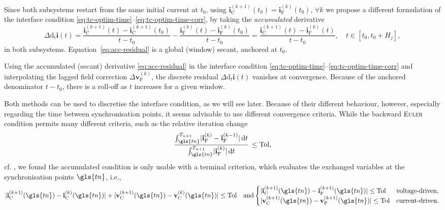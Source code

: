 Since both subsystems restart from the same initial current at $t_0$, using $\mathbf{i}_{\text{C}}^{(k+1)}(t_0) = \mathbf{i}_{\text{F}}^{(k)}(t_0), \, \forall k$ we propose a different formulation of the interface condition \eqref{eq:tc-optim-time}--\eqref{eq:tc-optim-time-corr}, by taking the \textit{accumulated} derivative
\begin{equation} \label{eq:acc-residual}
    \Delta \mathrm{d}_{t} \mathbf{i}(t) = \frac{\mathbf{i}_{\text{C}}^{(k+1)}(t) - \mathbf{i}_{\text{C}}^{(k+1)}(t_0)}{t-t_0} - \frac{\mathbf{i}_{\text{F}}^{(k)}(t) - \mathbf{i}_{\text{F}}^{(k)}(t_0)}{t-t_0} = \frac{\mathbf{i}_{\text{C}}^{(k+1)}(t) - \mathbf{i}_{\text{F}}^{(k)}(t)}{t-t_0}, \quad t \in [t_0, t_0 + H_j],
\end{equation}
in both subsystems. Equation~\eqref{eq:acc-residual} is a global (window) secant, anchored at $t_0$.

\begin{corollary} \label{corollary:acc-condition}
    Using the accumulated (secant) derivative \eqref{eq:acc-residual} in the interface condition \eqref{eq:tc-optim-time}--\eqref{eq:tc-optim-time-corr} and interpolating the lagged field correction $\Delta \mathbf{v}_{\text{F}}^{(k)}$, the discrete residual $\Delta \mathrm{d}_{t} \mathbf{i}(t)$ vanishes at convergence. Because of the anchored denominator $t-t_0$, there is a roll-off as $t$ increases for a given window.
\end{corollary}

Both methods can be used to discretise the interface condition, as we will see later. Because of their different behaviour, however, especially regarding the time between synchronisation points, it seems advisable to use different convergence criteria. While the backward \textsc{Euler} condition permits many different criteria, such as the relative iteration change
\begin{equation} \label{eq:L1-criterion}
    \frac{\int_{\gls{tn}}^{T_{n+1}} \lvert \mathbf{i}_{\text{F}}^{(k)} - \mathbf{i}_{\text{F}}^{(k-1)} \rvert \, \mathrm{d}t}{\int_{\gls{tn}}^{T_{n+1}} \lvert \mathbf{i}_{\text{F}}^{(k)} \rvert \, \mathrm{d}t} \, \leq \text{Tol},
\end{equation}
cf. \cite{Garcia2017}, we found the accumulated condition is only usable with a terminal criterion, which evaluates the exchanged variables at the synchronisation points $\gls{tn}$, i.e.,
\begin{equation*}
    \lvert \mathbf{i}_{\text{C}}^{(k+1)}(\gls{tn}) - \mathbf{i}_{\text{C}}^{(k)}(\gls{tn}) \rvert + \lvert \mathbf{v}_{\text{C}}^{(k+1)}(\gls{tn}) - \mathbf{v}_{\text{C}}^{(k)}(\gls{tn}) \rvert \leq \text{Tol} \quad \text{and} \begin{cases}
        \lvert \mathbf{i}_{\text{C}}^{(k+1)}(\gls{tn}) - \mathbf{i}_{\text{F}}^{(k+1)}(\gls{tn}) \rvert \leq \text{Tol}      & \text{voltage-driven}, \\
        \lvert \mathbf{v}_{\text{C}}^{(k+1)}(\gls{tn}) - \mathbf{v}_{\text{F}}^{(k+1)}(\gls{tn}) \rvert \leq \text{Tol}       & \text{current-driven}.
    \end{cases}
\end{equation*}


